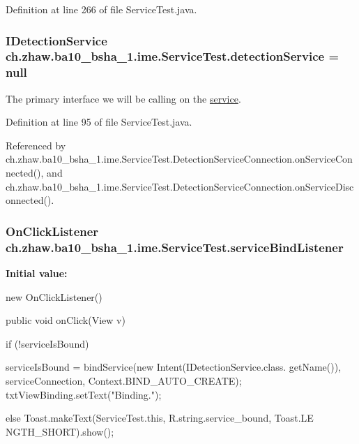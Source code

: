 Definition at line 266 of file ServiceTest.java.\hypertarget{classch_1_1zhaw_1_1ba10__bsha__1_1_1ime_1_1ServiceTest_aa8b6876190c4c3bfdba83a05065ee667}{
\subsubsection[{detectionService}]{\setlength{\rightskip}{0pt plus 5cm}IDetectionService {\bf ch.zhaw.ba10\_\-bsha\_\-1.ime.ServiceTest.detectionService} = null}}
\label{classch_1_1zhaw_1_1ba10__bsha__1_1_1ime_1_1ServiceTest_aa8b6876190c4c3bfdba83a05065ee667}
The primary interface we will be calling on the \hyperlink{namespacech_1_1zhaw_1_1ba10__bsha__1_1_1service}{service}. 

Definition at line 95 of file ServiceTest.java.

Referenced by ch.zhaw.ba10\_\-bsha\_\-1.ime.ServiceTest.DetectionServiceConnection.onServiceConnected(), and ch.zhaw.ba10\_\-bsha\_\-1.ime.ServiceTest.DetectionServiceConnection.onServiceDisconnected().\hypertarget{classch_1_1zhaw_1_1ba10__bsha__1_1_1ime_1_1ServiceTest_a4fd63657e481b0a7fa19836a9bfad101}{
\subsubsection[{serviceBindListener}]{\setlength{\rightskip}{0pt plus 5cm}OnClickListener {\bf ch.zhaw.ba10\_\-bsha\_\-1.ime.ServiceTest.serviceBindListener}}}
\label{classch_1_1zhaw_1_1ba10__bsha__1_1_1ime_1_1ServiceTest_a4fd63657e481b0a7fa19836a9bfad101}
{\bfseries Initial value:}
\begin{DoxyCode}
 new OnClickListener() {
        public void onClick(View v) {
            if (!serviceIsBound) {
                    
                    
                    
                    
                serviceIsBound =  bindService(new Intent(IDetectionService.class.
      getName()), serviceConnection, Context.BIND_AUTO_CREATE);
                    txtViewBinding.setText("Binding.");
            } else {
                Toast.makeText(ServiceTest.this, R.string.service_bound, Toast.LE
      NGTH_SHORT).show();
            }
        }
    }
\end{DoxyCode}


